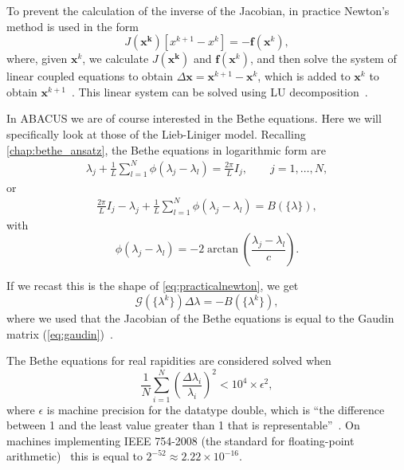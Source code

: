 \documentclass[11pt, a4paper]{report} %
\begin{document}
To prevent the calculation of the inverse of the Jacobian, in practice Newton's method is used in the form
\begin{equation}\label{eq:practicalnewton}
  J(\mathbf{x^k})[x^{k+1} - x^k] = - \mathbf{f}(\mathbf{x}^k),
\end{equation}
where, given \(\mathbf{x}^k\), we calculate \(J(\mathbf{x^k})\) and \( \mathbf{f}(\mathbf{x}^k)\), and then solve the system of linear coupled equations to obtain \(\Delta\mathbf{x}=\mathbf{x}^{k+1} - \mathbf{x}^k\), which is added to \(\mathbf{x}^k\) to obtain \(\mathbf{x}^{k+1}\)~\cite{Sueli2003}. 
This linear system can be solved using LU decomposition~\cite{Press2007}.

In ABACUS we are of course interested in the Bethe equations.
Here we will specifically look at those of the Lieb-Liniger model.
Recalling \cref{chap:bethe_ansatz}, the Bethe equations in logarithmic form are 
\begin{align}
  \lambda_j + \frac{1}{L} \sum_{l=1}^N \phi(\lambda_j - \lambda_l) = \frac{2\pi}{L}I_j, \qquad j = 1,\ldots,N,
\end{align}
or
\begin{align}
  \frac{2\pi}{L}I_j - \lambda_j + \frac{1}{L} \sum_{l=1}^N \phi(\lambda_j - \lambda_l) = B(\{\lambda\}),
\end{align}
with
\begin{equation}
  \phi(\lambda_j - \lambda_l) = -2\arctan\left(\frac{\lambda_j-\lambda_l}{c}\right).
\end{equation}

If we recast this is the shape of \cref{eq:practicalnewton}, we get
\begin{equation}
  \mathcal{G}(\{\lambda^k\}) \Delta \lambda = -B(\{\lambda^k\}),
\end{equation}
where we used that the Jacobian of the Bethe equations is equal to the Gaudin matrix (\cref{eq:gaudin})~\cite{Caux2009}.

The Bethe equations for real rapidities are considered solved when~\cite{Caux2009}
\begin{equation}
	\frac{1}{N}\sum_{i=1}^{N} \left(\frac{\Delta \lambda_i}{\lambda_i}\right)^2 < 10^4 \times \epsilon^2,
\end{equation}
where \(\epsilon\) is machine precision for the datatype double, which is ``the difference between 1 and the least value greater than 1 that is representable''~\cite{cppstandard2016}.
On machines implementing IEEE 754-2008 (the standard for floating-point arithmetic)~\cite{ieeefp2008} this is equal to \({2^{-52} \approx 2.22 \times 10^{-16}}\).
\end{document}
